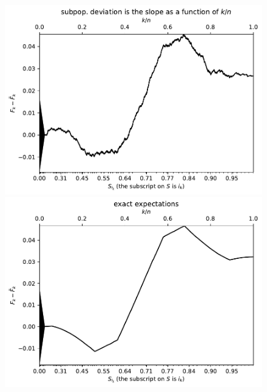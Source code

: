 \documentclass{article}
\begin{document}
\begin{figure}
\begin{centering}

\parbox{\imsize}{\includegraphics[width=\imsize]
                {./codes/unweighted/50000_2500_10_1/cumulative.pdf}}
\quad\quad
\parbox{\imsize}{\includegraphics[width=\imsize]
                {./codes/unweighted/50000_2500_10_1/cumulative_exact.pdf}}

\vspace{\vertsep}


\end{centering}
\end{figure}
\end{document}
